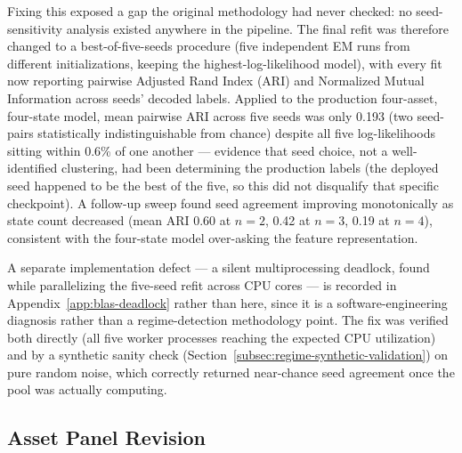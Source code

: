 Fixing this exposed a gap the original methodology had never checked: no seed-sensitivity analysis existed anywhere in the pipeline. The final refit was therefore changed to a best-of-five-seeds procedure (five independent EM runs from different initializations, keeping the highest-log-likelihood model), with every fit now reporting pairwise Adjusted Rand Index (ARI) \cite{hubert1985} and Normalized Mutual Information across seeds' decoded labels. Applied to the production four-asset, four-state model, mean pairwise ARI across five seeds was only 0.193 (two seed-pairs statistically indistinguishable from chance) despite all five log-likelihoods sitting within 0.6\% of one another --- evidence that seed choice, not a well-identified clustering, had been determining the production labels (the deployed seed happened to be the best of the five, so this did not disqualify that specific checkpoint). A follow-up sweep found seed agreement improving monotonically as state count decreased (mean ARI 0.60 at $n=2$, 0.42 at $n=3$, 0.19 at $n=4$), consistent with the four-state model over-asking the feature representation.

A separate implementation defect --- a silent multiprocessing deadlock, found while parallelizing the five-seed refit across CPU cores --- is recorded in Appendix~\ref{app:blas-deadlock} rather than here, since it is a software-engineering diagnosis rather than a regime-detection methodology point. The fix was verified both directly (all five worker processes reaching the expected CPU utilization) and by a synthetic sanity check (Section~\ref{subsec:regime-synthetic-validation}) on pure random noise, which correctly returned near-chance seed agreement once the pool was actually computing.

\subsection{Asset Panel Revision}
\label{subsec:regime-asset-panel-revision}

